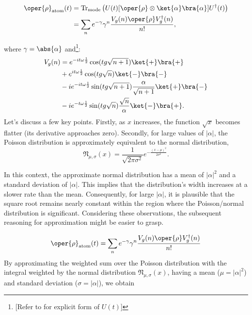 \begin{align}
\oper{\rho}_{\text{atom}}(t) &= 
\text{Tr}_{\text{mode}} \left( U(t)[\oper{\rho} \otimes \ket{\alpha}\bra{\alpha}]U^\dagger(t) \right) \nonumber \\
 &= \sum_n e^{-\gamma} \gamma^n \frac{V_g(n)\oper{\rho} V_g^\dagger(n)}{n!},
\end{align}

where \(\gamma = \abs{\alpha}\) and\footnote{[Refer to  for explicit form of \(U(t)\)]}:
\begin{align}
        \label{eq:appen_JCM_V_g}
    V_g (n) &=e^{-it\omega\frac{1}{2}}  \cos(tg\sqrt{n + 1})\ket{+}\bra{+}\\
&+ e^{it\omega\frac{1}{2}} \cos(tg\sqrt{n})\ket{-}\bra{-}\\
&- ie^{-it\omega\frac{1}{2}} \sin(tg\sqrt{n + 1}) \frac{\alpha}{\sqrt{n + 1}} \ket{+}\bra{-}\\
&- ie^{-t\omega\frac{1}{2}} \sin(tg\sqrt{n}) \frac{\sqrt{n}}{\alpha} \ket{-}\bra{+}.
\end{align}
Let's discuss a few key points. Firstly, as \( x \) increases, the function 
\( \sqrt{x} \) becomes flatter (its derivative approaches zero). Secondly, 
for large values of \( |\alpha| \), the Poisson distribution is approximately 
equivalent to the normal distribution, 
\begin{equation}
\mathfrak{N}_{\mu, \sigma}(x) = \frac{1}{\sqrt{2\pi\sigma^2}} e^{-\frac{(x-\mu)^2}{2\sigma^2}}.
\end{equation}

In this context, the approximate normal distribution has a mean of \( |\alpha|^2 \) and a 
standard deviation of \( |\alpha| \). This implies that the distribution's width increases 
at a slower rate than the mean. Consequently, for large \( |\alpha| \), it is plausible 
that the square root remains nearly constant within the region where the Poisson/normal 
distribution is significant. Considering these observations, the subsequent reasoning 
for approximation might be easier to grasp.

\begin{equation}
\oper{\rho}_{\text{atom}}(t) = \sum_n e^{-\gamma} \gamma^n \frac{V_g(n)\oper{\rho} V_g^\dagger(n)}{n!}
\end{equation}
By approximating the weighted sum over the Poisson distribution with the integral weighted by 
the normal distribution \( \mathfrak{N}_{\mu, \sigma}(x)\), having a mean (\( \mu =  |\alpha|^2 \)) 
and standard deviation (\( \sigma = |\alpha| \)), we obtain

